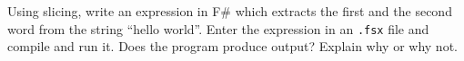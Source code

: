 Using slicing, write an expression in F\# which extracts the first and the second word from the string “hello world”.  Enter the expression in an \lstinline{.fsx} file and compile and run it. Does the program produce output? Explain why or why not.
